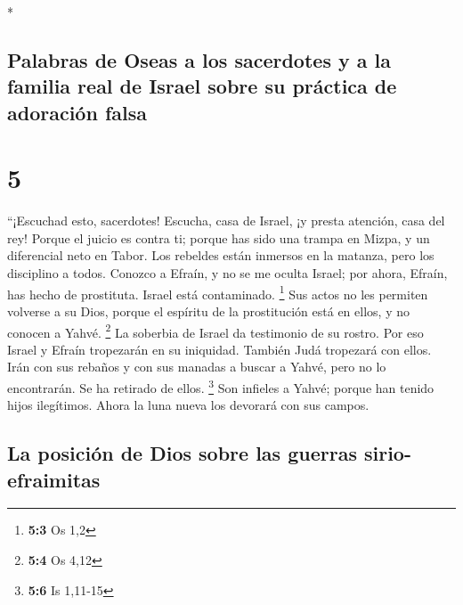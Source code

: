 \begin{paracol}{2}
\begin{otherlanguage}{english}
\end{otherlanguage}

\switchcolumn[0]*

\hypertarget{palabras-de-oseas-a-los-sacerdotes-y-a-la-familia-real-de-israel-sobre-su-pruxe1ctica-de-adoraciuxf3n-falsa}{%
\subsection{Palabras de Oseas a los sacerdotes y a la familia real de
Israel sobre su práctica de adoración
falsa}\label{palabras-de-oseas-a-los-sacerdotes-y-a-la-familia-real-de-israel-sobre-su-pruxe1ctica-de-adoraciuxf3n-falsa}}

\hypertarget{section-8}{%
\section{5}\label{section-8}}

 ``¡Escuchad esto, sacerdotes! Escucha, casa de Israel, ¡y
presta atención, casa del rey! Porque el juicio es contra ti; porque has
sido una trampa en Mizpa, y un diferencial neto en Tabor. 
Los rebeldes están inmersos en la matanza, pero los disciplino a todos.
 Conozco a Efraín, y no se me oculta Israel; por ahora,
Efraín, has hecho de prostituta. Israel está contaminado. \footnote{\textbf{5:3}
  Os 1,2}  Sus actos no les permiten volverse a su Dios,
porque el espíritu de la prostitución está en ellos, y no conocen a
Yahvé. \footnote{\textbf{5:4} Os 4,12}  La soberbia de
Israel da testimonio de su rostro. Por eso Israel y Efraín tropezarán en
su iniquidad. También Judá tropezará con ellos.  Irán con
sus rebaños y con sus manadas a buscar a Yahvé, pero no lo encontrarán.
Se ha retirado de ellos. \footnote{\textbf{5:6} Is 1,11-15}
 Son infieles a Yahvé; porque han tenido hijos ilegítimos.
Ahora la luna nueva los devorará con sus campos.

\hypertarget{la-posiciuxf3n-de-dios-sobre-las-guerras-sirio-efraimitas}{%
\subsection{La posición de Dios sobre las guerras
sirio-efraimitas}\label{la-posiciuxf3n-de-dios-sobre-las-guerras-sirio-efraimitas}}


\end{paracol}
